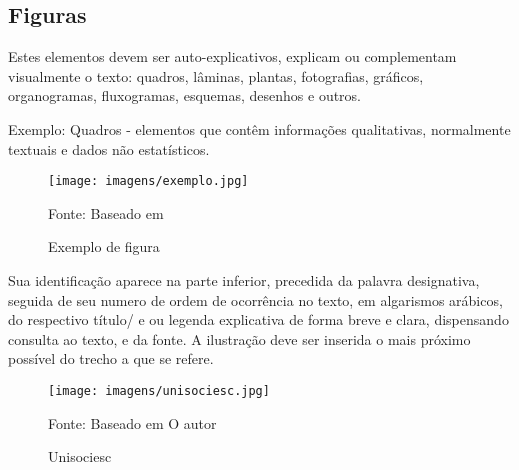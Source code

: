 \subsection{Figuras}

Estes elementos devem ser auto-explicativos, explicam ou complementam visualmente o texto: quadros, lâminas, plantas, fotografias, gráficos, organogramas, fluxogramas, esquemas, desenhos e outros.

Exemplo: Quadros - elementos que contêm informações qualitativas, normalmente textuais e dados não estatísticos.

\begin{figure}[htbp]
\centering
\texttt{[image: imagens/exemplo.jpg]}
\caption{Exemplo de figura}
\label{fig:exemploFig1}
\footnotesize Fonte: Baseado em 
\end{figure}

Sua identificação aparece na parte inferior, precedida da palavra designativa, seguida de seu numero de ordem de ocorrência no texto, em algarismos arábicos, do respectivo título/ e ou legenda explicativa de forma breve e clara, dispensando consulta ao texto, e da fonte. A ilustração deve ser inserida o mais próximo possível do trecho a que se refere.

\begin{figure}[htbp]
\centering
\texttt{[image: imagens/unisociesc.jpg]}
\caption{Unisociesc}
\label{fig:exemploFig1}
\footnotesize Fonte: Baseado em O autor
\end{figure}
